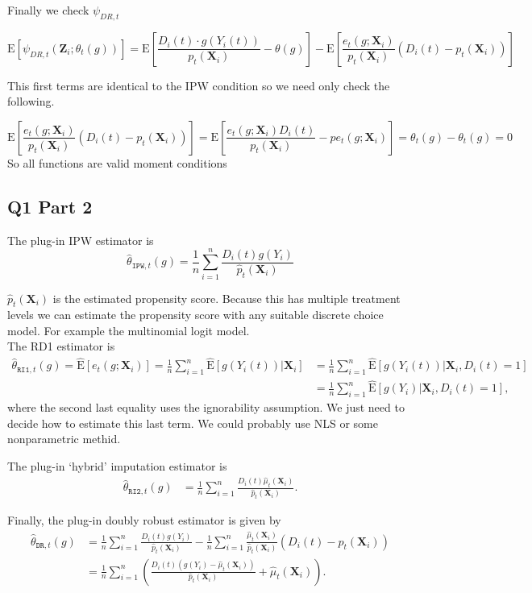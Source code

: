 \documentclass[11pt]{article}
\newcommand{\E}{\mathrm{E}}
\begin{document}
Finally we check $\psi_{DR,t}$

$$ \E[\psi_{DR,t}(\bm{Z}_i;\theta_t(g))] = \E \left[ \frac{D_i(t) \cdot g(Y_i(t))}{p_t(\bm{X}_i)} - \theta(g)  \right] - \E \left[ \frac{e_t(g;\bm{X}_i)}{p_t(\bm{X}_i)}  (D_i(t) - p_t(\bm{X}_i)) \right]
$$

This first terms are identical to the IPW condition so we need only check the following. 

$$  \E \left[ \frac{e_t(g;\bm{X}_i)}{p_t(\bm{X}_i)}  (D_i(t) - p_t(\bm{X}_i)) \right] =  \E \left[ \frac{e_t(g;\bm{X}_i)D_i(t)}{p_t(\bm{X}_i)}   - pe_t(g;\bm{X}_i) \right] =  \theta_t(g) -  \theta_t(g) =0 $$
So all functions are valid moment conditions

\subsection{Q1 Part 2}

The plug-in IPW estimator is 
$$
\hat{\theta}_{\texttt{IPW},t}(g) = \frac{1}{n}\sum_{i=1}^n\frac{D_i(t)g(Y_i)}{\hat p_t(\bm{X}_i)}
$$

 $\hat p_t(\bm{X}_i)$ is the estimated propensity score. Because this has multiple treatment levels we can estimate the propensity score with any suitable discrete choice model. For example the multinomial logit model. \\ 
 

The RD1 estimator is 
\begin{align*}
\hat{\theta}_{\texttt{RI1},t}(g) = \hat{\E}[e_t(g;\bm{X}_i)] =  \frac{1}{n}\sum_{i=1}^n \hat{\E}[g(Y_i(t))|\bm{X}_i] &=  \frac{1}{n}\sum_{i=1}^n \hat{\E}[g(Y_i(t))|\bm{X}_i, D_i(t)=1] \\
&= \frac{1}{n}\sum_{i=1}^n \hat{\E}[g(Y_i)|\bm{X}_i, D_i(t)=1],
\end{align*}
where the second last equality uses the ignorability assumption. We just need to decide how to estimate this last term. We could probably use NLS or some nonparametric methid.


The plug-in `hybrid' imputation estimator is 
\begin{align*}
\hat{\theta}_{\texttt{RI2},t}(g) &=  \frac{1}{n}\sum_{i=1}^n\frac{D_i(t)\widehat{\mu}_t(\bm{X}_i)}{\hat p_t(\bm{X}_i)}. 
\end{align*}

Finally, the plug-in doubly robust estimator is given by
\begin{align*}
\hat{\theta}_{\texttt{DR},t}(g) &= \frac{1}{n}\sum_{i=1}^n\frac{D_i(t)g(Y_i)}{\hat p_t(\bm{X}_i)}-\frac{1}{n}\sum_{i=1}^n\frac{\widehat{\mu}_t(\bm{X}_i)}{\hat p_t(\bm{X}_i)}(D_i(t) - \hat p_t(\bm{X}_i))\\
&=\frac{1}{n}\sum_{i=1}^n \left(\frac{D_i(t)(g(Y_i) - \widehat{\mu}_t(\bm{X}_i))}{\hat p_t(\bm{X}_i)} + \widehat{\mu}_t(\bm{X}_i) \right).
\end{align*}
\end{document}

